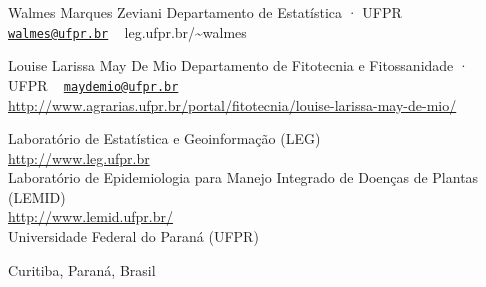 \documentclass[a4paper,]{book}
\begin{document}
\begin{flushleft}
            {\large Walmes Marques Zeviani}
      \newline {\footnotesize \faInstitution~~}Departamento de Estatística · UFPR
            \newline \faEnvelopeSquare~      \texttt{\href{mailto:walmes@ufpr.br}{\nolinkurl{walmes@ufpr.br}}}     
              \newline \faGlobe~                       leg.ufpr.br/\textasciitilde{}walmes        
      
      

         \vspace{1em}
            {\large Louise Larissa May De Mio}
      \newline {\footnotesize \faInstitution~~}Departamento de Fitotecnia e Fitossanidade · UFPR
            \newline \faEnvelopeSquare~      \texttt{\href{mailto:maydemio@ufpr.br}{\nolinkurl{maydemio@ufpr.br}}}     
              \newline \faGlobe~                       \url{http://www.agrarias.ufpr.br/portal/fitotecnia/louise-larissa-may-de-mio/}        
      
      

        \end{flushleft}


\vspace*{2em}

\begin{flushleft} Laboratório de Estatística e Geoinformação (LEG)\\ \url{http://www.leg.ufpr.br}\\ Laboratório de Epidemiologia para Manejo Integrado de Doenças de Plantas (LEMID)\\ \url{http://www.lemid.ufpr.br/}\\ Universidade Federal do Paraná (UFPR)\newline\newline \end{flushleft}

\vspace*{\fill}

\begin{center} Curitiba, Paraná, Brasil\\ \the\year\\ \end{center}

\clearpage
\end{document}
